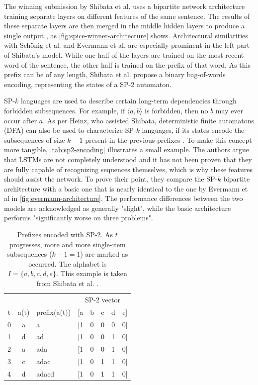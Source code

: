The winning submission by Shibata et al. uses a bipartite network architecture training separate layers on different features of the same sentence. The results of these separate layers are then merged in the middle hidden layers to produce a single output \cite{shibata2016bipartite}, as \autoref{fig:spice-winner-architecture} shows. Architectural similarities with Schönig et al. and Evermann et al. are especially prominent in the left part of Shibata's model.
While one half of the layers are trained on the most recent word of the sentence, the other half is trained on the prefix of that word. As this prefix can be of any length, Shibata et al. propose a binary bag-of-words encoding, representing the states of a SP-2 automaton.

SP-$k$ languages are used to describe certain long-term dependencies through forbidden subsequences. For example, if $\langle a,b \rangle$ is forbidden, then no $b$ may ever occur after $a$. As per Heinz, who assisted Shibata, deterministic finite automatons (DFA) can also be used to characterize SP-$k$ languages, if its states encode the subsequences of size $k-1$  present in the previous prefixes \cite{heinz2010estimatingSP}. To make this concept more tangible, \autoref{tab:sp2-encoding} illustrates a small example. The authors argue that LSTMs are not completely understood and it has not been proven that they are fully capable of recognizing sequences themselves, which is why these features should assist the network. To prove their point, they compare the SP-$k$ bipartite architecture with a basic one that is nearly identical to the one by Evermann et al in \autoref{fig:evermann-architecture}. The performance differences between the two models are acknowledged as generally "slight", while the basic architecture performs "significantly worse on three problems". 

\begin{table}
    \centering
    \begin{tabular}{cclccccc}
        \hline
          &      &              & \multicolumn{5}{c}{SP-2 vector}\\
        t & a(t) & prefix(a(t)) & [a & b & c & d & e]\\
        \hline
        0 & a    & a            & [1 & 0 & 0 & 0 & 0]\\
        1 & d    & ad           & [1 & 0 & 0 & 1 & 0]\\
        2 & a    & ada          & [1 & 0 & 0 & 1 & 0]\\
        3 & c    & adac         & [1 & 0 & 1 & 1 & 0]\\
        4 & d    & adacd        & [1 & 0 & 1 & 1 & 0]\\
        \hline
    \end{tabular}
    \caption{Prefixes encoded with SP-2. As $t$ progresses, more and more single-item subsequences ($k-1=1$) are marked as occurred. The alphabet is $I=\{a,b,c,d,e\}$. This example is taken from Shibata et al.  \cite{shibata2016bipartite}.}
    \label{tab:sp2-encoding}
\end{table}

